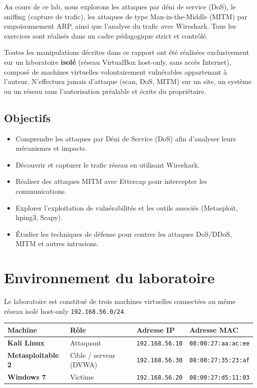 \documentclass[11pt,a4paper]{article}
\begin{document}
Au cours de ce lab, nous explorons les attaques par déni de service (DoS), le sniffing
(capture de trafic), les attaques de type Man-in-the-Middle (MITM) par empoisonnement
ARP, ainsi que l'analyse du trafic avec Wireshark. Tous les exercices sont réalisés dans
un cadre pédagogique strict et contrôlé.

\begin{avertissement}
Toutes les manipulations décrites dans ce rapport ont été réalisées exclusivement sur un
laboratoire \textbf{isolé} (réseau VirtualBox host-only, sans accès Internet), composé de
machines virtuelles volontairement vulnérables appartenant à l'auteur. N'effectuez jamais
d'attaque (scan, DoS, MITM) sur un site, un système ou un réseau sans l'autorisation
préalable et écrite du propriétaire.
\end{avertissement}

\subsection{Objectifs}
\begin{itemize}[leftmargin=1.4em]
  \item Comprendre les attaques par Déni de Service (DoS) afin d'analyser leurs mécanismes et impacts.
  \item Découvrir et capturer le trafic réseau en utilisant Wireshark.
  \item Réaliser des attaques MITM avec Ettercap pour intercepter les communications.
  \item Explorer l'exploitation de vulnérabilités et les outils associés (Metasploit, hping3, Scapy).
  \item Étudier les techniques de défense pour contrer les attaques DoS/DDoS, MITM et autres intrusions.
\end{itemize}

\section{Environnement du laboratoire}
Le laboratoire est constitué de trois machines virtuelles connectées au même réseau
isolé host-only \texttt{192.168.56.0/24}.

\begin{center}
\renewcommand{\arraystretch}{1.3}
\begin{tabular}{>{\bfseries}l l l l}
\toprule
Machine & Rôle & Adresse IP & Adresse MAC \\
\midrule
Kali Linux        & Attaquant                   & \texttt{192.168.56.10} & \texttt{08:00:27:aa:ac:ee} \\
Metasploitable 2  & Cible / serveur (DVWA)      & \texttt{192.168.56.30} & \texttt{08:00:27:35:23:af} \\
Windows 7         & Victime                     & \texttt{192.168.56.20} & \texttt{08:00:27:d5:11:03}  \\
\bottomrule
\end{tabular}
\end{center}
\end{document}
